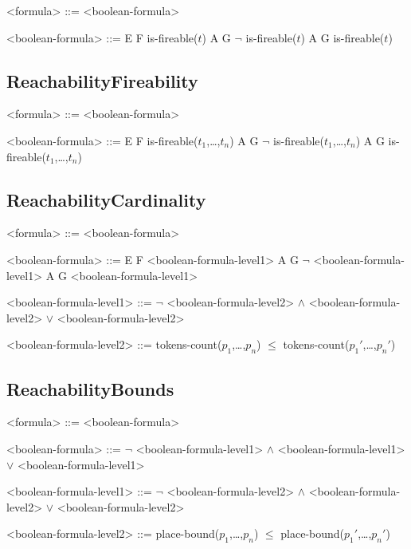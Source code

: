 \documentclass[10pt,english,a4paper]{article}
\begin{document}
\begin{grammar}

<formula> ::= <boolean-formula> 

<boolean-formula> ::= E F is-fireable($t$)
\alt A G $\lnot$ is-fireable($t$)
\alt A G is-fireable($t$)

\end{grammar}

\subsection{ReachabilityFireability}

\begin{grammar}

<formula> ::= <boolean-formula>

<boolean-formula> ::= E F is-fireable($t_1$,\dots,$t_n$)
\alt A G $\lnot$ is-fireable($t_1$,\dots,$t_n$)
\alt A G is-fireable($t_1$,\dots,$t_n$)

\end{grammar}

\subsection{ReachabilityCardinality}

\begin{grammar}

<formula> ::= <boolean-formula>

<boolean-formula> ::= E F <boolean-formula-level1>
\alt A G $\lnot$ <boolean-formula-level1>
\alt A G <boolean-formula-level1>

<boolean-formula-level1> ::= $\lnot$ <boolean-formula-level2>
 $\wedge$ <boolean-formula-level2>
 $\vee$ <boolean-formula-level2>

<boolean-formula-level2> ::= tokens-count($p_1$,\dots,$p_n$) $\leq$ tokens-count($p_1'$,\dots,$p_n'$)

\end{grammar}

\subsection{ReachabilityBounds}

\begin{grammar}

<formula> ::= <boolean-formula>

<boolean-formula> ::= $\lnot$ <boolean-formula-level1>
 $\wedge$ <boolean-formula-level1>
 $\vee$ <boolean-formula-level1>

<boolean-formula-level1> ::= $\lnot$ <boolean-formula-level2>
 $\wedge$ <boolean-formula-level2>
 $\vee$ <boolean-formula-level2>

<boolean-formula-level2> ::= place-bound($p_1$,\dots,$p_n$) $\leq$ place-bound($p_1'$,\dots,$p_n'$)

\end{grammar}
\end{document}
